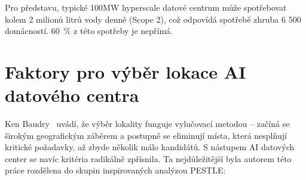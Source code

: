 Pro představu, typické 100MW hyperscale datové centrum může spotřebovat kolem 2 milionů litrů vody denně (Scope 2), což odpovídá spotřebě zhruba 6 500 domácností. 60~\% z této spotřeby je nepřímá.~\cite{international_energy_agency_iea_energy_2025}


\section{Faktory pro výběr lokace AI datového centra}
\label{sec:lokalita}


Ken Baudry~\cite{geng_data_2014} uvádí, že výběr lokality funguje vylučovací metodou -- začíná se širokým geografickým záběrem a postupně se eliminují místa, která nesplňují kritické požadavky, až zbyde několik málo kandidátů. S nástupem AI datových center se navíc kritéria radikálně zpřísnila. Ta nejdůležitější byla autorem této práce rozdělena do skupin inspirovaných analýzou PESTLE:

